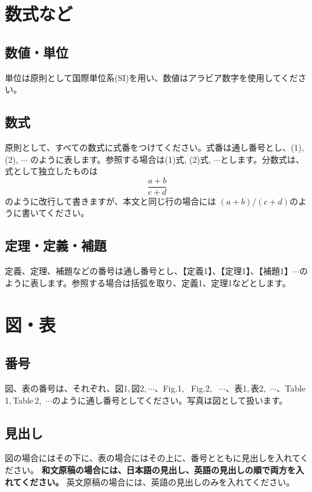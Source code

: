\documentclass{hissymp}
\begin{document}
\section{数式など}

\subsection{数値・単位}
単位は原則として国際単位系(SI)を用い、数値はアラビア数字を使用してください。

\subsection{数式}
原則として、すべての数式に式番をつけてください。式番は通し番号とし、(1), (2), $ \cdots $ のように表します。参照する場合は(1)式, (2)式, $ \cdots $とします。分数式は、式として独立したものは
\begin{equation}
	\frac{a+b}{c+d}
	\label{formula}
\end{equation}
のように改行して書きますが、本文と同じ行の場合には $ (a+b) / (c+d) $のように書いてください。

\subsection{定理・定義・補題}
定義、定理、補題などの番号は通し番号とし、【定義1】、【定理1】、【補題1】$ \cdots $のように表します。参照する場合は括弧を取り、定義1、定理1などとします。


\section{図・表}

\subsection{番号}
図、表の番号は、それぞれ、図1,\,図2,\,$ \cdots $、Fig.1, \, Fig.2, \, $ \cdots $、表1,\,表2,\, $ \cdots $、Table\,1,\,Table\,2,\, $ \cdots $のように通し番号としてください。写真は図として扱います。

\subsection{見出し}
図の場合にはその下に、表の場合にはその上に、番号とともに見出しを入れてください。
{\bf 和文原稿の場合には、日本語の見出し、英語の見出しの順で両方を入れてください。} 
英文原稿の場合には、英語の見出しのみを入れてください。
\end{document}
